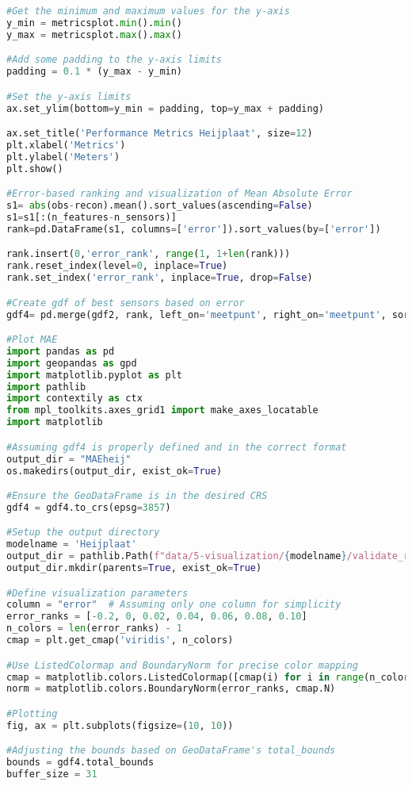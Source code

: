 \begin{lstlisting}[language=Python]
#Get the minimum and maximum values for the y-axis
y_min = metricsplot.min().min()
y_max = metricsplot.max().max()

#Add some padding to the y-axis limits 
padding = 0.1 * (y_max - y_min)

#Set the y-axis limits 
ax.set_ylim(bottom=y_min = padding, top=y_max + padding)

ax.set_title('Performance Metrics Heijplaat', size=12)
plt.xlabel('Metrics')
plt.ylabel('Meters')
plt.show()

#Error-based ranking and visualization of Mean Absolute Error 
s1= abs(obs-recon).mean().sort_values(ascending=False)
s1=s1[:(n_features-n_sensors)]
rank=pd.DataFrame(s1, columns=['error']).sort_values(by=['error'])

rank.insert(0,'error_rank', range(1, 1+len(rank)))
rank.reset_index(level=0, inplace=True)
rank.set_index('error_rank', inplace=True, drop=False)

#Create gdf of best sensors based on error
gdf4= pd.merge(gdf2, rank, left_on='meetpunt', right_on='meetpunt', sort=False, how='right').to_crs(epsg=28992)

#Plot MAE 
import pandas as pd
import geopandas as gpd
import matplotlib.pyplot as plt
import pathlib
import contextily as ctx
from mpl_toolkits.axes_grid1 import make_axes_locatable
import matplotlib

#Assuming gdf4 is properly defined and in the correct format
output_dir = "MAEheij"
os.makedirs(output_dir, exist_ok=True)

#Ensure the GeoDataFrame is in the desired CRS
gdf4 = gdf4.to_crs(epsg=3857)

#Setup the output directory
modelname = 'Heijplaat'
output_dir = pathlib.Path(f"data/5-visualization/{modelname}/validate_ranks")
output_dir.mkdir(parents=True, exist_ok=True)

#Define visualization parameters
column = "error"  # Assuming only one column for simplicity
error_ranks = [-0.2, 0, 0.02, 0.04, 0.06, 0.08, 0.10]
n_colors = len(error_ranks) - 1
cmap = plt.get_cmap('viridis', n_colors)

#Use ListedColormap and BoundaryNorm for precise color mapping
cmap = matplotlib.colors.ListedColormap([cmap(i) for i in range(n_colors)])
norm = matplotlib.colors.BoundaryNorm(error_ranks, cmap.N)

#Plotting
fig, ax = plt.subplots(figsize=(10, 10))

#Adjusting the bounds based on GeoDataFrame's total_bounds
bounds = gdf4.total_bounds
buffer_size = 31


\end{lstlisting}
